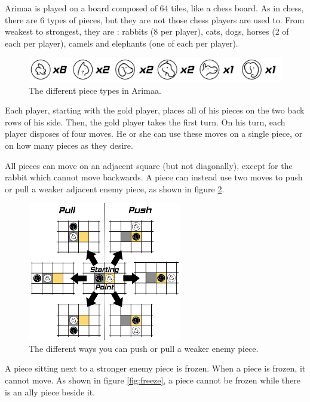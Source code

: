 Arimaa is played on a board composed of 64 tiles, like a chess board. As in chess, there are 6 types of pieces, but they are not those chess players are used to. From weakest to strongest, they are : rabbits (8 per player), cats, dogs, horses (2 of each per player), camels and elephants (one of each per player).

\begin{figure}[!h]
\centering
\includegraphics[width=\textwidth]{1_Presentation/1.1_Arimaa_rules_Gabriel/Pictures/Pieces.png}
\caption{The different piece types in Arimaa.}
\label{fig:pieces}
\end{figure}

Each player, starting with the gold player, places all of his pieces on the two back rows of his side. Then, the gold player takes the first turn.
On his turn, each player disposes of four moves. He or she can use these moves on a single piece, or on how many pieces as they desire.

All pieces can move on an adjacent square (but not diagonally), except for the rabbit which cannot move backwards.
A piece can instead use two moves to push or pull a weaker adjacent enemy piece, as shown in figure \ref{fig:displace}.

\begin{figure}[!h]
\centering
\includegraphics[width=0.6\textwidth]{1_Presentation/1.1_Arimaa_rules_Gabriel/Pictures/Displace.png}
\caption{The different ways you can push or pull a weaker enemy piece.}
\label{fig:displace}
\end{figure}

A piece sitting next to a stronger enemy piece is frozen. When a piece is frozen, it cannot move. As shown in figure \ref{fig:freeze}, a piece cannot be frozen while there is an ally piece beside it.

